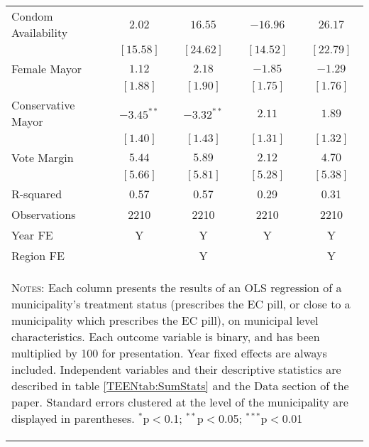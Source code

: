 \begin{table}
\begin{center}
\begin{tabular}{l c c c c }
Condom Availability & $2.02$       & $16.55$      & $-16.96$    & $26.17$       \\
                    & $[15.58]$    & $[24.62]$    & $[14.52]$   & $[22.79]$     \\
Female Mayor        & $1.12$       & $2.18$       & $-1.85$     & $-1.29$       \\
                    & $[1.88]$     & $[1.90]$     & $[1.75]$    & $[1.76]$      \\
Conservative Mayor  & $-3.45^{**}$ & $-3.32^{**}$ & $2.11$      & $1.89$        \\
                    & $[1.40]$     & $[1.43]$     & $[1.31]$    & $[1.32]$      \\
Vote Margin         & $5.44$       & $5.89$       & $2.12$      & $4.70$        \\
                    & $[5.66]$     & $[5.81]$     & $[5.28]$    & $[5.38]$      \\
\midrule
R-squared           & 0.57         & 0.57         & 0.29        & 0.31          \\
Observations        & 2210         & 2210         & 2210        & 2210          \\
Year FE&Y&Y&Y&Y\\ Region FE &&Y&&Y\\ \bottomrule
\multicolumn{5}{p{12cm}}{\begin{footnotesize}\textsc{Notes:}
      Each column presents the results of an OLS regression of a municipality's treatment
      status (prescribes the EC pill, or close to a municipality which prescribes the
      EC pill), on municipal level characteristics.  Each outcome variable is binary,
      and has been multiplied by 100 for presentation.  Year fixed effects are
      always included.  Independent variables and their descriptive statistics
      are described in table \ref{TEENtab:SumStats} and the Data section of the paper.
      Standard errors clustered at the level of the municipality are displayed in
      parentheses. $^{*}$p$<$0.1; $^{**}$p$<$0.05; $^{***}$p$<$0.01\end{footnotesize}}
\end{tabular}
\label{TEENtab:pillchoice}
\end{center}
\end{table}
